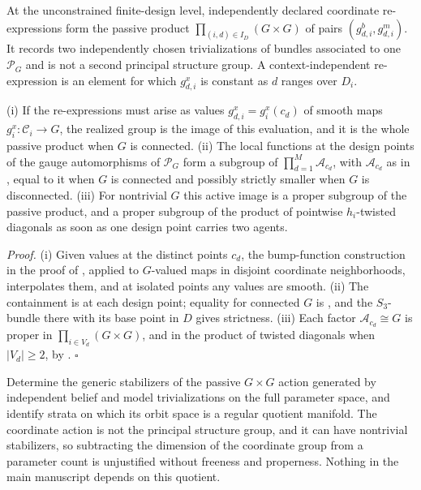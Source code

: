 At the unconstrained finite-design level, independently declared coordinate re-expressions form the
passive product \(\prod_{(i,d)\in I_D}(G\times G)\) of pairs \((g_{d,i}^b,g_{d,i}^m)\). It records two
independently chosen trivializations of bundles associated to one \(\mathscr P_G\) and is not a
second principal structure group. A context-independent re-expression is an element for which
\(g_{d,i}^x\) is constant as \(d\) ranges over \(D_i\).

(i) If the re-expressions must arise as values \(g_{d,i}^x=g_i^x(c_d)\) of smooth maps
\(g_i^x:\mathcal C_i\to G\), the realized group is the image of this evaluation, and it is the whole
passive product when \(G\) is connected. (ii) The local functions at the design points of the gauge
automorphisms of \(\mathscr P_G\) form a subgroup of \(\prod_{d=1}^{M}\mathcal A_{c_d}\), with
\(\mathcal A_{c_d}\) as in , equal to it when \(G\) is connected
and possibly strictly smaller when \(G\) is disconnected. (iii) For nontrivial \(G\) this active image
is a proper subgroup of the passive product, and a proper subgroup of the product of pointwise
\(h_i\)-twisted diagonals as soon as one design point carries two agents. 

\noindent\emph{Proof.}
(i) Given values at the distinct points \(c_d\), the bump-function construction in the proof of
, applied to \(G\)-valued maps in disjoint coordinate
neighborhoods, interpolates them, and at isolated points any values are smooth. (ii) The containment
is  at each design point; equality for connected \(G\) is
, and the \(S_3\)-bundle there with its base point in
\(D\) gives strictness. (iii) Each factor \(\mathcal A_{c_d}\cong G\) is proper in
\(\prod_{i\in V_d}(G\times G)\), and in the product of twisted diagonals when \(|V_d|\geq2\), by
. \hfill$\square$

Determine the generic stabilizers of the passive \(G\times G\) action generated by independent belief
and model trivializations on the full parameter space, and identify strata on which its orbit space
is a regular quotient manifold. The coordinate action is not the principal structure group, and it
can have nontrivial stabilizers, so subtracting the dimension of the coordinate group from a
parameter count is unjustified without freeness and properness. Nothing in the main manuscript
depends on this quotient.


